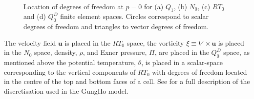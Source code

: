 \documentclass[review,times]{elsarticle}
\begin{document}
\begin{figure}
\centering
{}%
\\
%
%
\caption{\label{fig:fem-spaces} Location of degrees of freedom at $p=0$ for 
(a) $Q_{1}$, (b) $N_0$, (c) $RT_0$ and (d) $Q_0^D$ finite element spaces.
Circles correspond to scalar degrees of freedom and triangles to vector degrees
of freedom.}
\end{figure}
%
The velocity field $\mathbf{u}$ is placed in the $RT_0$ space, the vorticity 
$\xi\equiv\nabla\times\mathbf{u}$ is placed in the $N_0$ space, density, $\rho$, 
and Exner pressure, $\Pi$, are placed in the $Q_0^D$ space, as mentioned above 
the potential temperature, $\theta$, is placed in a scalar-space corresponding 
to the vertical components of $RT_0$ with degrees of freedom located in the
centre of the top and bottom faces of a cell. See \cite{melvin2018} for a full
description of the discretisation used in the GungHo model.
\end{document}
